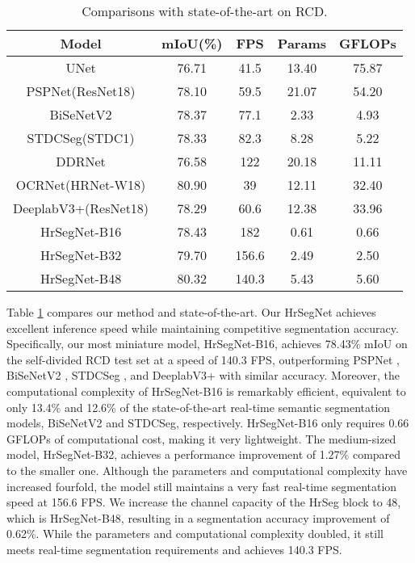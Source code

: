 \documentclass[preprint,12pt,authoryear]{elsarticle}
\begin{document}
\begin{center}
    \begin{table}[t]
        \centering
        \begin{tabular}{c|c |c |c |c}
        \toprule
             Model & mIoU(\%) & FPS & Params & GFLOPs \\
        \hline
             UNet & 76.71 & 41.5 &13.40 & 75.87\\ 
             PSPNet(ResNet18) & 78.10 & 59.5 & 21.07& 54.20\\ 
             BiSeNetV2 & 78.37& 77.1 &2.33 &4.93 \\ 
             STDCSeg(STDC1) & 78.33 & 82.3 & 8.28& 5.22\\ 
             DDRNet & 76.58& 122& 20.18& 11.11\\ 
             OCRNet(HRNet-W18) & 80.90& 39 & 12.11& 32.40\\ 
             DeeplabV3+(ResNet18) & 78.29& 60.6&12.38 &33.96 \\ 
             HrSegNet-B16 & 78.43& 182& 0.61& 0.66\\ 
             HrSegNet-B32 & 79.70& 156.6& 2.49&2.50 \\ 
             HrSegNet-B48 &80.32 & 140.3&5.43 &5.60 \\ 
        \bottomrule
        \end{tabular}
        \caption{Comparisons with state-of-the-art on RCD.}
        \label{tab:table5}
    \end{table}
\end{center}

Table \ref{tab:table5} compares our method and state-of-the-art. Our HrSegNet achieves excellent inference speed while maintaining competitive segmentation accuracy. Specifically, our most miniature model, HrSegNet-B16, achieves 78.43\% mIoU on the self-divided RCD test set at a speed of 140.3 FPS, outperforming PSPNet \citep{zhao2017pyramid}, BiSeNetV2 \citep{yu_bisenet_2020}, STDCSeg \citep{fan_rethinking_2021}, and DeeplabV3+ \citep{chen_rethinking_2017}with similar accuracy. Moreover, the computational complexity of HrSegNet-B16 is remarkably efficient, equivalent to only 13.4\% and 12.6\% of the state-of-the-art real-time semantic segmentation models, BiSeNetV2 and STDCSeg, respectively. HrSegNet-B16 only requires 0.66 GFLOPs of computational cost, making it very lightweight. The medium-sized model, HrSegNet-B32, achieves a performance improvement of 1.27\% compared to the smaller one. Although the parameters and computational complexity have increased fourfold, the model still maintains a very fast real-time segmentation speed at 156.6 FPS. We increase the channel capacity of the HrSeg block to 48, which is HrSegNet-B48, resulting in a segmentation accuracy improvement of 0.62\%. While the parameters and computational complexity doubled, it still meets real-time segmentation requirements and achieves 140.3 FPS.
\end{document}
